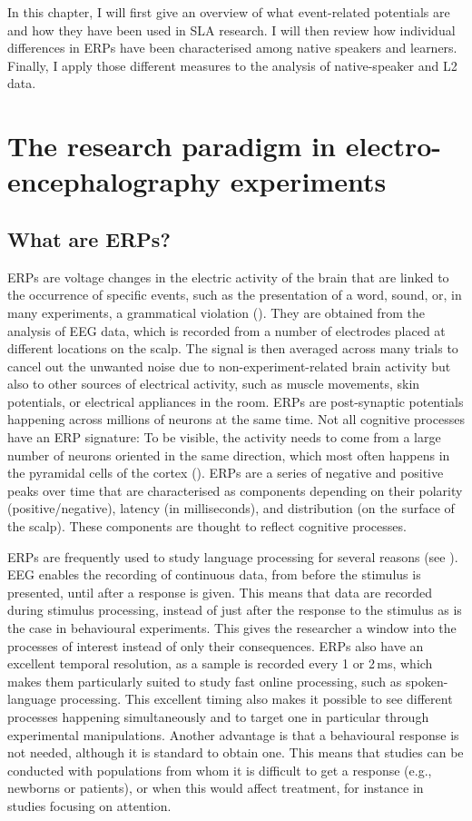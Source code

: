 \documentclass[output=paper,colorlinks,citecolor=brown,modfonts,nonflat]{../langscibook}
\begin{document}
In this chapter, I will first give an overview of what event-related potentials are and how they have been used in SLA research. I will then review how individual differences in ERPs have been characterised among native speakers and learners. Finally, I apply those different measures to the analysis of native-speaker and L2 data. 

\section{The research paradigm in electro-encephalography experiments}

\subsection{What are ERPs?}
ERPs are voltage changes in the electric activity of the brain that are linked to the occurrence of specific events, such as the presentation of a word, sound, or, in many experiments,  a grammatical violation (\citealt{FabianiEtAl2007,HellTokowicz2010}). They are obtained from the analysis of EEG data, which is recorded from a number of electrodes placed at different locations on the scalp. The signal is then averaged across many trials to cancel out the unwanted noise due to non-experiment-related brain activity but also to other sources of electrical activity, such as muscle movements, skin potentials, or electrical appliances in the room. ERPs are post-synaptic potentials happening across millions of neurons at the same time. Not all cognitive processes have an ERP signature: To be visible, the activity needs to come from a large number of neurons oriented in the same direction, which most often happens in the pyramidal cells of the cortex (\citealt{OsterhoutEtAl2004,Luck2014}). ERPs are a series of negative and positive peaks over time that are characterised as components depending on their polarity (positive/negative), latency (in milliseconds), and distribution (on the surface of the scalp). These components are thought to reflect cognitive processes.

ERPs are frequently used to study language processing for several reasons (see \citealt{Kaan2007,Luck2014}). EEG enables the recording of continuous data, from before the stimulus is presented, until after a response is given. This means that data are recorded during stimulus processing, instead of just after the response to the stimulus as is the case in behavioural experiments. This gives the researcher a window into the processes of interest instead of only their consequences. ERPs also have an excellent temporal resolution, as a sample is recorded every 1 or 2\,ms, which makes them particularly suited to study fast online processing, such as spoken-language processing. This excellent timing also makes it possible to see different processes happening simultaneously and to target one in particular through experimental manipulations. Another advantage is that a behavioural response is not needed, although it is standard to obtain one. This means that studies can be conducted with populations from whom it is difficult to get a response (e.g., newborns or patients), or when this would affect treatment, for instance in studies focusing on attention.
\end{document}
